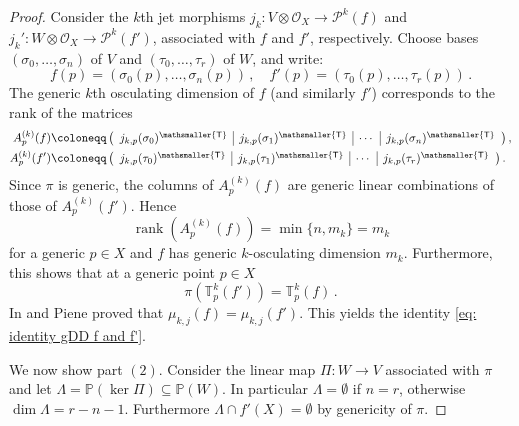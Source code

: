 \documentclass[11pt,reqno]{amsart}
\numberwithin{equation}{section}
\theoremstyle{plain}
\numberwithin{theorem}{section}
\theoremstyle{definition}
\renewcommand{\P}{\mathbb{P}}
\newcommand{\T}{\mathbb{T}}
\newcommand{\OO}{\mathcal{O}}
\newcommand{\PP}{\mathcal{P}}
\newcommand{\rank}{\operatorname{rank}}
\newcommand{\mT}{\mathsmaller{\mathsf{T}}}
\begin{document}
\begin{proof}
Consider the $k$th jet morphisms $j_k \colon V\otimes \OO_X \to \PP^k(f)$ and $j_k' \colon W\otimes\OO_X \to \PP^k(f')$, associated with $f$ and $f'$, respectively. Choose bases $(\sigma_0, \dots, \sigma_n)$ of $V$ and $(\tau_0, \dots, \tau_r)$ of $W$, and write:
\[
f(p) = (\sigma_0(p), \dots, \sigma_n(p))\,,\quad f'(p) = (\tau_0(p), \dots, \tau_r(p))\,.
\]
The generic $k$th osculating dimension of $f$ (and similarly $f'$) corresponds to the rank of the matrices
\begin{align*}
A^{(k)}_p(f) &\coloneqq 
\left(
\begin{array}{c|c|c|c}
j_{k,p}(\sigma_0)^\mT & j_{k,p}(\sigma_1)^\mT & \cdots & j_{k,p}(\sigma_n)^\mT 
\end{array}
\right), \\
A^{(k)}_p(f') &\coloneqq 
\left(
\begin{array}{c|c|c|c}
j_{k,p}(\tau_0)^\mT & j_{k,p}(\tau_1)^\mT & \cdots & j_{k,p}(\tau_r)^\mT 
\end{array}
\right).
\end{align*}
Since $\pi$ is generic, the columns of $A^{(k)}_p(f)$ are generic linear combinations of those of $A^{(k)}_p(f')$. Hence
\[
\rank(A^{(k)}_p(f)) = \min\{n, m_k\} = m_k
\]
for a generic $p\in X$ and $f$ has generic $k$-osculating dimension $m_k$. Furthermore, this shows that at a generic point $p\in X$
\begin{equation}\label{eq: projection tangent}
    \pi(\T_p^k(f'))=\T_p^k(f)\,.
\end{equation}
In \cite{piene2022higher} and \cite{piene1978polar} Piene proved that $\mu_{k,j}(f) = \mu_{k,j}(f')$. This yields the identity \eqref{eq: identity gDD f and f'}.

We now show part $(2)$. Consider the linear map $\Pi \colon W \to V$ associated with $\pi$ and let $\Lambda = \P(\ker\Pi) \subseteq\P(W)$. In particular $\Lambda=\emptyset$ if $n=r$, otherwise $\dim\Lambda=r-n-1$. Furthermore $\Lambda\cap f'(X)=\emptyset$ by genericity of $\pi$.


\end{proof}
\end{document}
